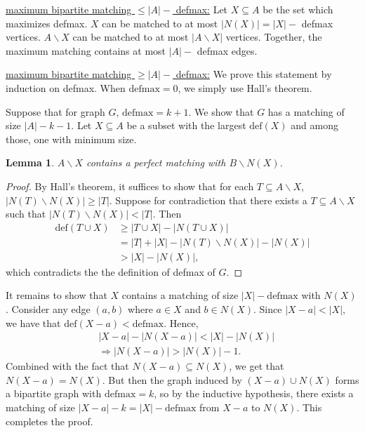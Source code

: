\documentclass[11pt,letterpaper]{article}
\newtheorem{lemma}[theorem]{Lemma}
\theoremstyle{definition}
\begin{document}
\ul{maximum bipartite matching $\leq |A| - $ defmax:}
Let $X\subseteq A$ be the set which maximizes defmax. 
$X$ can be matched to at most $|N(X)| = |X| - $ defmax vertices. 
$A\backslash X$ can be matched to at most $|A\backslash X|$ vertices. 
Together, the maximum matching contains at most $|A| - $ defmax edges.

\ul{maximum bipartite matching $\geq |A| - $ defmax:}
We prove this statement by induction on defmax. When $\mathrm{defmax}=0$, we simply use Hall's theorem.

Suppose that for graph $G$, $\mathrm{defmax} = k+1$. We show that $G$ has a matching of size $|A| -k-1$.
Let $X\subseteq A$ be a subset with the largest $\mathrm{def}(X)$ and among those, one with minimum size.

\begin{lemma}
    $A\backslash X$ contains a perfect matching with $B\backslash N(X)$.
\end{lemma}
\begin{proof}
    By Hall's theorem, it suffices to show that for each $T\subseteq A\backslash X$, $|N(T)\backslash N(X)|\geq |T|$.
    Suppose for contradiction that there exists a $T\subseteq A\backslash X$ such that $|N(T)\backslash N(X)| < |T|$.
    Then 
    \begin{align*}
        \mathrm{def}(T\cup X) &\geq |T\cup X| - |N(T\cup X)| \\
        &=|T| + |X| - |N(T)\backslash N(X)| - |N(X)| \\
        &> |X| - |N(X)|, 
    \end{align*}
    which contradicts the the definition of defmax of $G$.
\end{proof}

It remains to show that $X$ contains a matching of size $|X|-\mathrm{defmax}$ with $N(X)$. 
Consider any edge $(a,b)$ where $a\in X$ and $b\in N(X)$. 
Since $|X-a|<|X|$, we have that $\mathrm{def}(X-a)< \mathrm{defmax}$. 
Hence, 
\begin{align*}
    & |X-a| - |N(X-a)|<|X| - |N(X)|\\
    &\Rightarrow |N(X-a)|> |N(X)|-1.
\end{align*}
Combined with the fact that $N(X-a)\subseteq N(X)$, we get that $N(X-a) = N(X)$.
But then the graph induced by $(X-a)\cup N(X)$ forms a bipartite graph with $\mathrm{defmax}= k$, so by the inductive hypothesis, there exists a matching of size $|X-a| - k = |X| - \mathrm{defmax}$ from $X-a$ to $N(X)$.
This completes the proof.
\end{document}

